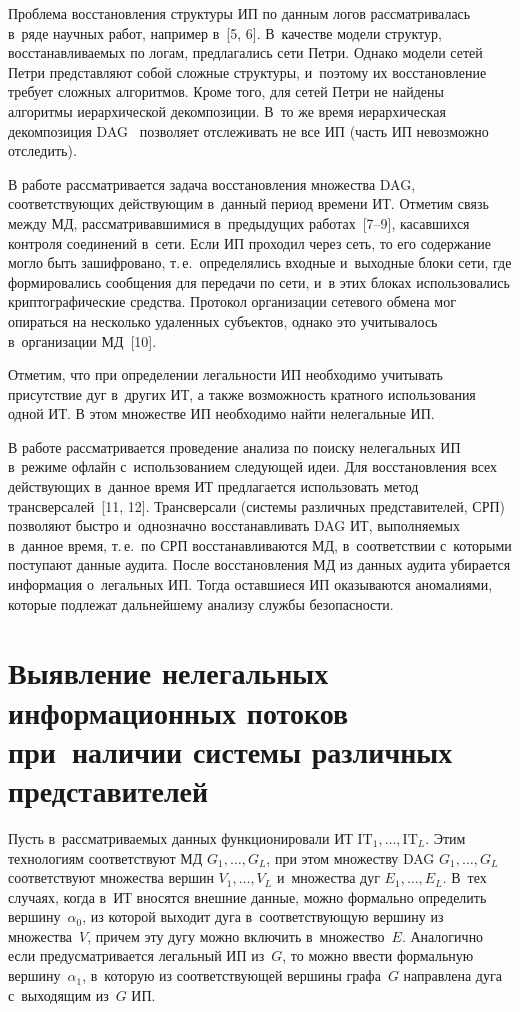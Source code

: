 \begin{multicols}{2}
  Проблема восстановления структуры ИП по данным 
логов рассматривалась в~ряде научных работ, например в~[5, 6]. В~качестве 
модели структур, восстанавливаемых по логам, предлагались сети Петри. Однако 
модели сетей Петри представляют собой сложные структуры, и~поэтому их 
вос\-ста\-нов\-ле\-ние требует сложных алгоритмов. Кроме того, для сетей Петри не 
найдены алгоритмы иерархической декомпозиции. В~то же время иерархическая 
декомпозиция DAG~\cite{1-gt} позволяет отслеживать не все ИП (часть ИП 
невозможно отследить). 
  
  В работе рассматривается задача восстановления множества DAG, 
соответствующих дей\-ст\-ву\-ющим в~данный период времени ИТ. Отметим связь 
между МД, рассматривавшимися в~предыдущих работах~[7--9], касавшихся 
контроля соединений в~сети. Если ИП проходил через сеть, то его содержание 
могло быть зашифровано, т.\,е.\ определялись входные и~выходные блоки сети, где 
формировались сообщения для передачи по сети, и~в этих блоках использовались 
криптографические средства. Протокол организации сетевого обмена мог 
опираться на несколько удаленных субъектов, однако это учитывалось 
в~организации МД~[10]. 
  
  Отметим, что при определении легальности ИП необходимо учитывать 
присутствие дуг в~других ИТ, а также возможность кратного использования одной 
ИТ. В этом множестве ИП необходимо найти нелегальные ИП. 
  
  В работе рассматривается проведение анализа по поиску нелегальных ИП 
в~режиме офлайн с~использованием следующей идеи. Для восстановления всех 
действующих в~данное время ИТ предлагается использовать метод 
трансверсалей~[11, 12]. Трансверсали (системы различных представителей, СРП) 
позволяют быстро и~однозначно вос\-ста\-нав\-ли\-вать DAG ИТ, выполняемых в~данное 
время, т.\,е.\ по СРП вос\-ста\-нав\-ли\-ва\-ют\-ся МД, в~соответствии с~которыми 
поступают данные аудита. После восстановления МД из данных аудита убирается 
информация о~легальных ИП. Тогда оставшиеся ИП оказываются аномалиями, 
которые подлежат дальнейшему анализу службы безопасности. 
  
  \section{Выявление нелегальных информационных потоков при~наличии системы
  различных представителей}
  
  Пусть в~рассматриваемых данных функционировали 
ИТ $\mathrm{IT}_1, \ldots , \mathrm{IT}_L$. Этим технологиям соответствуют 
МД 
$G_1,\ldots , G_L$, при этом множеству DAG $G_1,\ldots , G_L$ соответствуют 
множества вершин $V_1, \ldots, V_L$ и~множества дуг $E_1,\ldots , E_L$. В~тех 
случаях, когда в~ИТ вносятся внешние данные, можно формально определить 
вершину~$\alpha_0$, из которой выходит дуга в~соответствующую вершину из 
множества~$V$, причем эту дугу можно включить в~множество~$E$. Аналогично 
если предусматривается легальный ИП из~$G$, то можно ввести формальную 
вершину~$\alpha_1$, в~которую из соответствующей вершины графа~$G$ направлена 
дуга с~выходящим из~$G$ ИП. 
  

\end{multicols}
